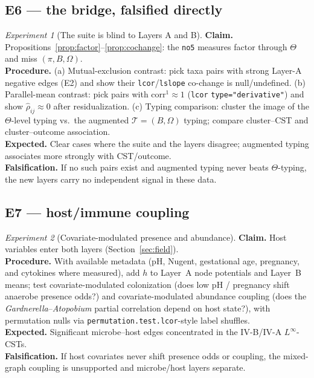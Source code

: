 \documentclass[11pt]{article}
\theoremstyle{definition}
\theoremstyle{plain}
\theoremstyle{remark}
\newtheorem{experiment}{Experiment}
\newcommand{\Linf}{L^{\infty}}
\newcommand{\1}{\mathbf{1}}
\newcommand{\Prec}{\Omega}
\newcommand{\Pres}{\pi}
\newcommand{\Edge}{B}
\begin{document}
\subsection{E6 --- the bridge, falsified directly}
\begin{experiment}[The suite is blind to Layers A and B]\label{exp:bridge}
\textbf{Claim.} Propositions~\ref{prop:factor}--\ref{prop:cochange}: the
\texttt{no5} measures factor through $\Theta$ and miss $(\Pres,\Edge,\Prec)$.\\
\textbf{Procedure.} (a) Mutual-exclusion contrast: pick taxa pairs with strong
Layer-A negative edges (E2) and show their \texttt{lcor}/\texttt{lslope}
co-change is null/undefined. (b) Parallel-mean contrast: pick pairs with
$\mathrm{corr}^1\approx1$ (\texttt{lcor} \texttt{type="derivative"}) and show
$\widehat\rho_{ij}\approx0$ after residualization. (c) Typing comparison: cluster
the image of the $\Theta$-level typing vs.\ the augmented $\mathcal{T}=(\Edge,\Prec)$
typing; compare cluster--CST and cluster--outcome association.\\
\textbf{Expected.} Clear cases where the suite and the layers disagree; augmented
typing associates more strongly with CST/outcome.\\
\textbf{Falsification.} If no such pairs exist and augmented typing never beats
$\Theta$-typing, the new layers carry no independent signal in these data.
\end{experiment}

\subsection{E7 --- host/immune coupling}
\begin{experiment}[Covariate-modulated presence and abundance]\label{exp:host}
\textbf{Claim.} Host variables enter both layers (Section~\ref{sec:field}).\\
\textbf{Procedure.} With available metadata (pH, Nugent, gestational age,
pregnancy, and cytokines where measured), add $h$ to Layer~A node potentials and
Layer~B means; test covariate-modulated colonization (does low pH / pregnancy
shift anaerobe presence odds?) and covariate-modulated abundance coupling (does
the \emph{Gardnerella}--\emph{Atopobium} partial correlation depend on host
state?), with permutation nulls via \texttt{permutation.test.lcor}-style label
shuffles.\\
\textbf{Expected.} Significant microbe--host edges concentrated in the IV-B/IV-A
$\Linf$-CSTs.\\
\textbf{Falsification.} If host covariates never shift presence odds or coupling,
the mixed-graph coupling is unsupported and microbe/host layers separate.
\end{experiment}
\end{document}

